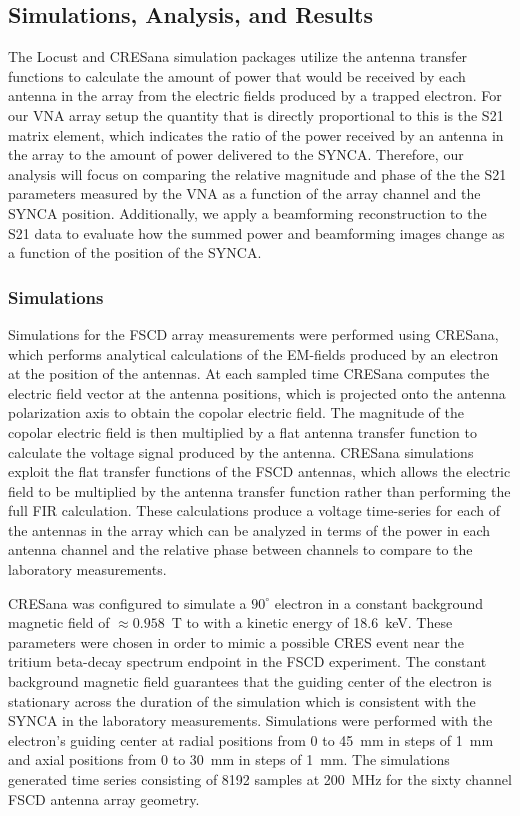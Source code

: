 \subsection{Simulations, Analysis, and Results}

The Locust and CRESana simulation packages utilize the antenna transfer functions to calculate the amount of power that would be received by each antenna in the array from the electric fields produced by a trapped electron. For our VNA array setup the quantity that is directly proportional to this is the S21 matrix element, which indicates the ratio of the power received by an antenna in the array to the amount of power delivered to the SYNCA. Therefore, our analysis will focus on comparing the relative magnitude and phase of the the S21 parameters measured by the VNA as a function of the array channel and the SYNCA position. Additionally, we apply a beamforming reconstruction to the S21 data to evaluate how the summed power and beamforming images change as a function of the position of the SYNCA.

\subsubsection{Simulations}

Simulations for the FSCD array measurements were performed using CRESana, which performs analytical calculations of the EM-fields produced by an electron at the position of the antennas. At each sampled time CRESana computes the electric field vector at the antenna positions, which is projected onto the antenna polarization axis to obtain the copolar electric field. The magnitude of the copolar electric field is then multiplied by a flat antenna transfer function to calculate the voltage signal produced by the antenna. CRESana simulations exploit the flat transfer functions of the FSCD antennas, which allows the electric field to be multiplied by the antenna transfer function rather than performing the full FIR calculation. These calculations produce a voltage time-series for each of the antennas in the array which can be analyzed in terms of the power in each antenna channel and the relative phase between channels to compare to the laboratory measurements.

CRESana was configured to simulate a $90^\circ$ electron in a constant background magnetic field of $\approx0.958$~T to with a kinetic energy of 18.6~keV. These parameters were chosen in order to mimic a possible CRES event near the tritium beta-decay spectrum endpoint in the FSCD experiment. The constant background magnetic field guarantees that the guiding center of the electron is stationary across the duration of the simulation which is consistent with the SYNCA in the laboratory measurements. Simulations were performed with the electron's guiding center at radial positions from 0 to 45~mm in steps of 1~mm and axial positions from 0 to 30~mm in steps of 1~mm. The simulations generated time series consisting of 
8192 samples at 200~MHz for the sixty channel FSCD antenna array geometry.

